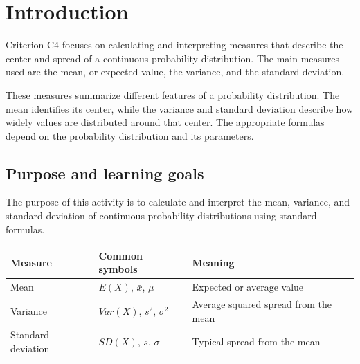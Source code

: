 	\vspace{-4mm}
	
	\section{Introduction}\label{sec:c4-introduction}
	\vspace{8mm}
	
	Criterion C4 focuses on calculating and interpreting measures that describe the
	center and spread of a continuous probability distribution.  The main measures
	used are the mean, or expected value, the variance, and the standard deviation.
	
	These measures summarize different features of a probability distribution.  The
	mean identifies its center, while the variance and standard deviation describe
	how widely values are distributed around that center.  The appropriate formulas
	depend on the probability distribution and its parameters.
	
\subsection{Purpose and learning goals}\label{sec:c4-intro-purpose}
The purpose of this activity is to calculate and interpret the mean, variance,
and standard deviation of continuous probability distributions using standard
formulas.

\begin{center}
	\renewcommand{\arraystretch}{1.2}
	\begin{tabular}{lll}
		\toprule
		Measure & Common symbols & Meaning \\
		\midrule
		Mean
		& $E(X)$, $\bar{x}$, $\mu$
		& Expected or average value \\
		
		Variance
		& $Var(X)$, $s^2$, $\sigma^2$
		& Average squared spread from the mean \\
		
		Standard deviation
		& $SD(X)$, $s$, $\sigma$
		& Typical spread from the mean \\
		\bottomrule
	\end{tabular}
\end{center}

